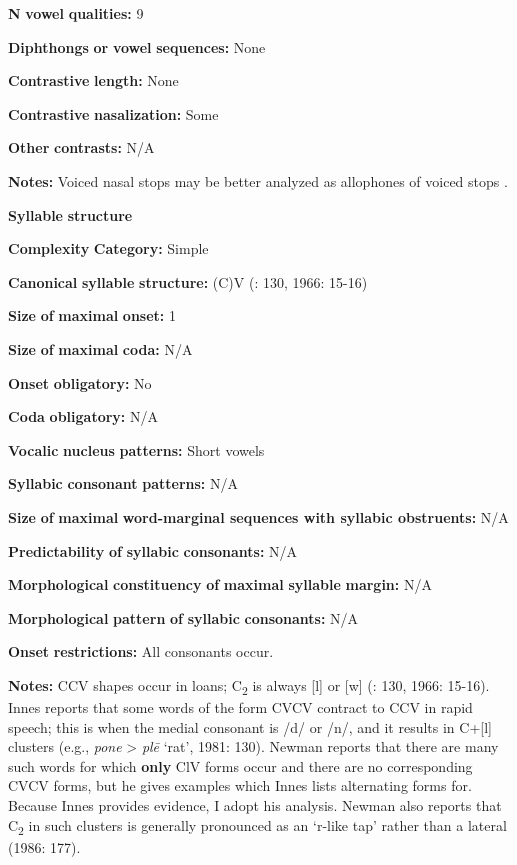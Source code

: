 \textbf{N} \textbf{vowel} \textbf{qualities:} 9

\textbf{Diphthongs} \textbf{or} \textbf{vowel} \textbf{sequences:} None

\textbf{Contrastive} \textbf{length:} None

\textbf{Contrastive} \textbf{nasalization:} Some

\textbf{Other} \textbf{contrasts:} N/A

\textbf{Notes:} Voiced nasal stops may be better analyzed as allophones of voiced stops \citep[176]{Newman1986}.

\textbf{Syllable} \textbf{structure}

\textbf{Complexity} \textbf{Category:} Simple

\textbf{Canonical} \textbf{syllable} \textbf{structure:} (C)V (\citealt{Innes1981}: 130, 1966: 15-16)

\textbf{Size} \textbf{of} \textbf{maximal} \textbf{onset:} 1

\textbf{Size} \textbf{of} \textbf{maximal} \textbf{coda:} N/A

\textbf{Onset} \textbf{obligatory:} No

\textbf{Coda} \textbf{obligatory:} N/A

\textbf{Vocalic} \textbf{nucleus} \textbf{patterns:} Short vowels

\textbf{Syllabic} \textbf{consonant} \textbf{patterns:} N/A

\textbf{Size} \textbf{of} \textbf{maximal} \textbf{word{}-marginal sequences with syllabic obstruents:} N/A

\textbf{Predictability} \textbf{of} \textbf{syllabic} \textbf{consonants:} N/A

\textbf{Morphological} \textbf{constituency} \textbf{of} \textbf{maximal} \textbf{syllable} \textbf{margin:} N/A

\textbf{Morphological} \textbf{pattern} \textbf{of} \textbf{syllabic} \textbf{consonants:} N/A

\textbf{Onset} \textbf{restrictions:} All consonants occur.

\textbf{Notes:} CCV shapes occur in loans; C\textsubscript{2} is always [l] or [w] (\citealt{Innes1981}: 130, 1966: 15-16). Innes reports that some words of the form CVCV contract to CCV in rapid speech; this is when the medial consonant is /d/ or /n/, and it results in C+[l] clusters (e.g., \textit{pone} > \textit{plē} ‘rat’, 1981: 130). Newman reports that there are many such words for which \textbf{only} ClV forms occur and there are no corresponding CVCV forms, but he gives examples which Innes lists alternating forms for. Because Innes provides evidence, I adopt his analysis. Newman also reports that C\textsubscript{2} in such clusters is generally pronounced as an ‘r-like tap’ rather than a lateral (1986: 177).

